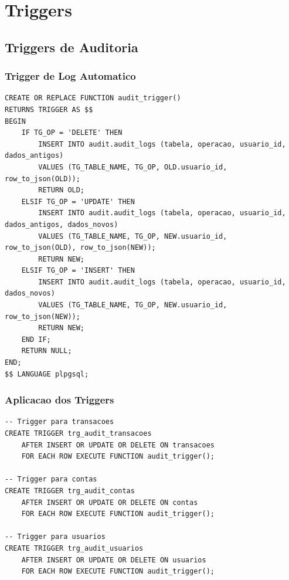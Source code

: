 \section{Triggers}

\subsection{Triggers de Auditoria}

\subsubsection{Trigger de Log Automatico}

\begin{lstlisting}[caption=Funcao generica de auditoria]
CREATE OR REPLACE FUNCTION audit_trigger()
RETURNS TRIGGER AS $$
BEGIN
    IF TG_OP = 'DELETE' THEN
        INSERT INTO audit.audit_logs (tabela, operacao, usuario_id, dados_antigos)
        VALUES (TG_TABLE_NAME, TG_OP, OLD.usuario_id, row_to_json(OLD));
        RETURN OLD;
    ELSIF TG_OP = 'UPDATE' THEN
        INSERT INTO audit.audit_logs (tabela, operacao, usuario_id, dados_antigos, dados_novos)
        VALUES (TG_TABLE_NAME, TG_OP, NEW.usuario_id, row_to_json(OLD), row_to_json(NEW));
        RETURN NEW;
    ELSIF TG_OP = 'INSERT' THEN
        INSERT INTO audit.audit_logs (tabela, operacao, usuario_id, dados_novos)
        VALUES (TG_TABLE_NAME, TG_OP, NEW.usuario_id, row_to_json(NEW));
        RETURN NEW;
    END IF;
    RETURN NULL;
END;
$$ LANGUAGE plpgsql;
\end{lstlisting}

\subsubsection{Aplicacao dos Triggers}

\begin{lstlisting}[caption=Criacao dos triggers de auditoria]
-- Trigger para transacoes
CREATE TRIGGER trg_audit_transacoes
    AFTER INSERT OR UPDATE OR DELETE ON transacoes
    FOR EACH ROW EXECUTE FUNCTION audit_trigger();

-- Trigger para contas
CREATE TRIGGER trg_audit_contas
    AFTER INSERT OR UPDATE OR DELETE ON contas
    FOR EACH ROW EXECUTE FUNCTION audit_trigger();

-- Trigger para usuarios
CREATE TRIGGER trg_audit_usuarios
    AFTER INSERT OR UPDATE OR DELETE ON usuarios
    FOR EACH ROW EXECUTE FUNCTION audit_trigger();
\end{lstlisting}

